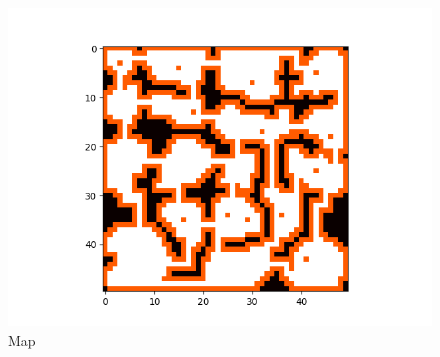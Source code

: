 \begin{figure}[!ht]
	\centering
	\includegraphics[scale=0.8]{images/map.png}
	\caption{Map}
	\label{fig:map}
\end{figure}

